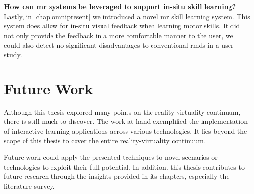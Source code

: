 \textbf{How can \acrlong{mr} systems be leveraged to support in-situ skill learning?}\\
Lastly, in \autoref{chap:omnipresent} we introduced a novel \acrshort{mr} skill learning system. This system does allow for in-situ visual feedback when learning motor skills. It did not only provide the feedback in a more comfortable manner to the user, we could also detect no significant disadvantages to conventional \acrshort{rmd}s in a user study.


\section{Future Work}
\label{sec:conclusion:future}

Although this thesis explored many points on the reality-virtuality continuum, there is still much to discover. The work at hand exemplified the implementation of interactive learning applications across various technologies. It lies beyond the scope of this thesis to cover the entire reality-virtuality continuum.

Future work could apply the presented techniques to novel scenarios or technologies to exploit their full potential. In addition, this thesis contributes to future research through the insights provided in its chapters, especially the literature survey.
